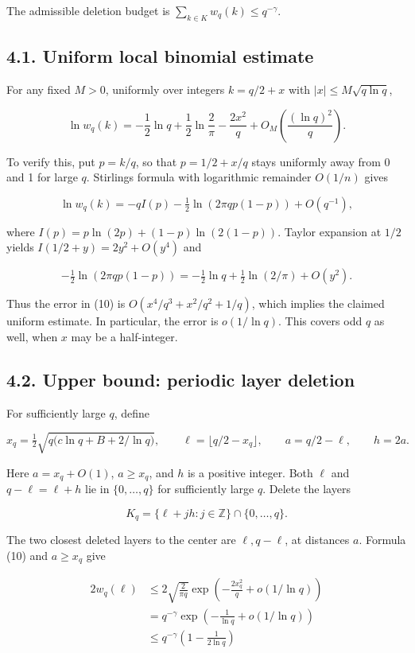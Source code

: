 \documentclass[
  10pt,
]{article}
\begin{document}
The admissible deletion budget is \(\sum_{k\in K}w_q(k)\le q^{-\gamma}\).

\subsection{4.1. Uniform local binomial estimate}\label{uniform-local-binomial-estimate}

For any fixed \(M>0\), uniformly over integers \(k=q/2+x\) with \(|x|\le M\sqrt{q\ln q}\),

\[
 \ln w_q(k)=-\frac12\ln q+\frac12\ln\frac2\pi
               -\frac{2x^2}{q}
               +O_M\!\left(\frac{(\ln q)^2}{q}\right).\tag{10}
\]

To verify this, put \(p=k/q\), so that \(p=1/2+x/q\) stays uniformly away from 0 and 1 for large \(q\). Stirling\textquotesingle s formula with logarithmic remainder \(O(1/n)\) gives

\[
 \ln w_q(k)=-qI(p)-\tfrac12\ln(2\pi qp(1-p))+O(q^{-1}),
\]

where \(I(p)=p\ln(2p)+(1-p)\ln(2(1-p))\). Taylor expansion at \(1/2\) yields \(I(1/2+y)=2y^2+O(y^4)\) and

\[
 -\tfrac12\ln(2\pi qp(1-p))
 =-\tfrac12\ln q+\tfrac12\ln(2/\pi)+O(y^2).
\]

Thus the error in (10) is \(O(x^4/q^3+x^2/q^2+1/q)\), which implies the claimed uniform estimate. In particular, the error is \(o(1/\ln q)\). This covers odd \(q\) as well, when \(x\) may be a half-integer.

\subsection{4.2. Upper bound: periodic layer deletion}\label{upper-bound-periodic-layer-deletion}

For sufficiently large \(q\), define

\[
 x_q=\tfrac12\sqrt{q\bigl(c\ln q+B+2/\ln q\bigr)},\qquad
 \ell=\lfloor q/2-x_q\rfloor,
 \qquad a=q/2-\ell,
 \qquad h=2a.
\]

Here \(a=x_q+O(1)\), \(a\ge x_q\), and \(h\) is a positive integer. Both \(\ell\) and \(q-\ell=\ell+h\) lie in \(\{0,\ldots,q\}\) for sufficiently large \(q\). Delete the layers

\[
 K_q=\{\ell+jh:j\in\mathbb Z\}\cap\{0,\ldots,q\}.\tag{11}
\]

The two closest deleted layers to the center are \(\ell,q-\ell\), at distances \(a\). Formula (10) and \(a\ge x_q\) give

\[
 \begin{aligned}
 2w_q(\ell)
 &\le 2\sqrt{\frac{2}{\pi q}}
      \exp\left(-\frac{2x_q^2}{q}+o(1/\ln q)\right)\\
 &=q^{-\gamma}\exp\left(-\frac1{\ln q}+o(1/\ln q)\right)\\
 &\le q^{-\gamma}\left(1-\frac1{2\ln q}\right)
 \end{aligned}\tag{12}
\]
\end{document}
